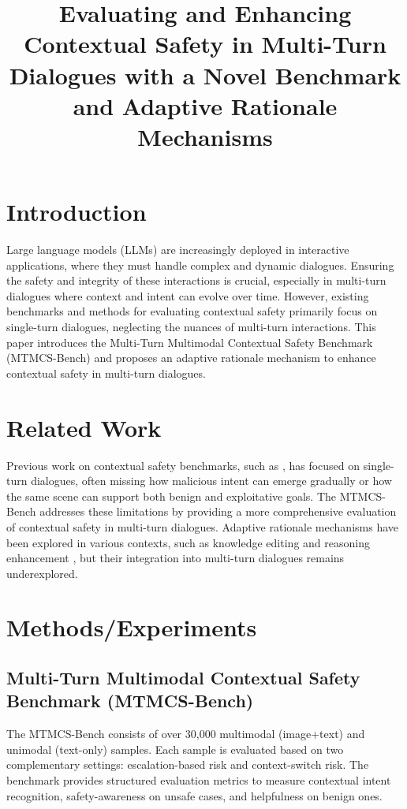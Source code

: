 \documentclass{article}
\title{Evaluating and Enhancing Contextual Safety in Multi-Turn Dialogues with a Novel Benchmark and Adaptive Rationale Mechanisms}
\author{}
\date{}
\begin{document}
\maketitle

\section{Introduction}
Large language models (LLMs) are increasingly deployed in interactive applications, where they must handle complex and dynamic dialogues. Ensuring the safety and integrity of these interactions is crucial, especially in multi-turn dialogues where context and intent can evolve over time. However, existing benchmarks and methods for evaluating contextual safety primarily focus on single-turn dialogues, neglecting the nuances of multi-turn interactions. This paper introduces the Multi-Turn Multimodal Contextual Safety Benchmark (MTMCS-Bench) and proposes an adaptive rationale mechanism to enhance contextual safety in multi-turn dialogues.

\section{Related Work}
Previous work on contextual safety benchmarks, such as \cite{liu2026mtmcsbenchevaluatingcontextualsafety}, has focused on single-turn dialogues, often missing how malicious intent can emerge gradually or how the same scene can support both benign and exploitative goals. The MTMCS-Bench addresses these limitations by providing a more comprehensive evaluation of contextual safety in multi-turn dialogues. Adaptive rationale mechanisms have been explored in various contexts, such as knowledge editing \cite{kodathala2026llmscompressllmsadaptive} and reasoning enhancement \cite{zhou2026amorybuildingcoherentnarrativedriven}, but their integration into multi-turn dialogues remains underexplored.

\section{Methods/Experiments}
\subsection{Multi-Turn Multimodal Contextual Safety Benchmark (MTMCS-Bench)}
The MTMCS-Bench consists of over 30,000 multimodal (image+text) and unimodal (text-only) samples. Each sample is evaluated based on two complementary settings: escalation-based risk and context-switch risk. The benchmark provides structured evaluation metrics to measure contextual intent recognition, safety-awareness on unsafe cases, and helpfulness on benign ones.
\end{document}
